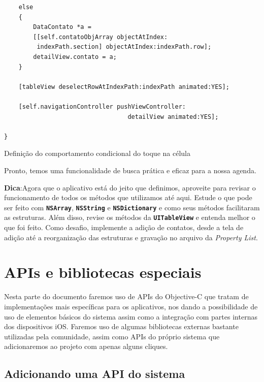 \documentclass[a4paper,12pt,brazil,doubleside]{book}
\begin{document}
\begin{singlespace}
\begin{listing}[H]
\begin{verbatim}
    else
    {
        DataContato *a =
        [[self.contatoObjArray objectAtIndex:
         indexPath.section] objectAtIndex:indexPath.row];
        detailView.contato = a;
    }
    
    [tableView deselectRowAtIndexPath:indexPath animated:YES];
    
    [self.navigationController pushViewController:
                                  detailView animated:YES];
    
}
\end{verbatim}
\caption{Definição do comportamento condicional do toque na célula}
\end{listing}


Pronto, temos uma funcionalidade de busca prática e eficaz para a nossa agenda.

\begin{framed}

\textbf{Dica}:Agora que o aplicativo está do jeito que definimos, aproveite para revisar o funcionamento de todos os métodos que utilizamos até aqui. Estude o que pode ser feito com \texttt{\textbf{NSArray}}, \texttt{\textbf{NSString}} e \texttt{\textbf{NSDictionary}} e como seus métodos facilitaram as estruturas. Além disso, revise os métodos da \texttt{\textbf{UITableView}} e entenda melhor o que foi feito. Como desafio, implemente a adição de contatos, desde a tela de adição até a reorganização das estruturas e gravação no arquivo da \emph{Property List}.
\end{framed}

\chapter{APIs e bibliotecas especiais}


Nesta parte do documento faremos uso de APIs do Objective-C que tratam de implementações mais específicas para os aplicativos, nos dando a possibilidade de uso de elementos básicos do sistema assim como a integração com partes internas dos dispositivos iOS. Faremos uso de algumas bibliotecas externas bastante utilizadas pela comunidade, assim como APIs do próprio sistema que adicionaremos ao projeto com apenas alguns cliques.

\bigskip
\bigskip


\section{Adicionando uma API do sistema}



\end{singlespace}
\end{document}
